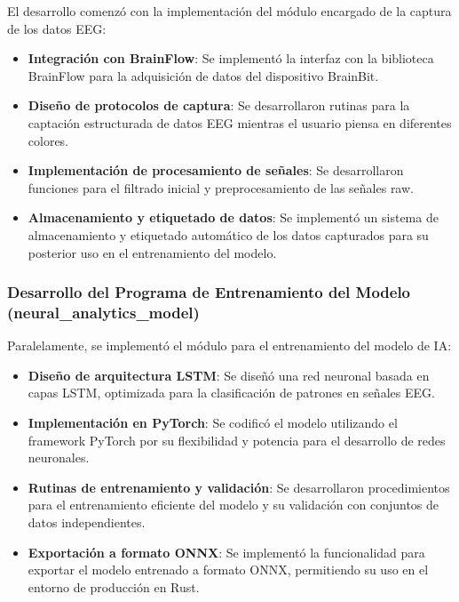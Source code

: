El desarrollo comenzó con la implementación del módulo encargado de la captura de los datos EEG:

\begin{itemize}
    \item \textbf{Integración con BrainFlow}: Se implementó la interfaz con la biblioteca BrainFlow para la adquisición de datos del dispositivo BrainBit.
    
    \item \textbf{Diseño de protocolos de captura}: Se desarrollaron rutinas para la captación estructurada de datos EEG mientras el usuario piensa en diferentes colores.
    
    \item \textbf{Implementación de procesamiento de señales}: Se desarrollaron funciones para el filtrado inicial y preprocesamiento de las señales raw.
    
    \item \textbf{Almacenamiento y etiquetado de datos}: Se implementó un sistema de almacenamiento y etiquetado automático de los datos capturados para su posterior uso en el entrenamiento del modelo.
\end{itemize}

\subsubsection{Desarrollo del Programa de Entrenamiento del Modelo (neural\_analytics\_model)}

Paralelamente, se implementó el módulo para el entrenamiento del modelo de IA:

\begin{itemize}
    \item \textbf{Diseño de arquitectura LSTM}: Se diseñó una red neuronal basada en capas LSTM, optimizada para la clasificación de patrones en señales EEG.
    
    \item \textbf{Implementación en PyTorch}: Se codificó el modelo utilizando el framework PyTorch por su flexibilidad y potencia para el desarrollo de redes neuronales.
    
    \item \textbf{Rutinas de entrenamiento y validación}: Se desarrollaron procedimientos para el entrenamiento eficiente del modelo y su validación con conjuntos de datos independientes.
    
    \item \textbf{Exportación a formato ONNX}: Se implementó la funcionalidad para exportar el modelo entrenado a formato ONNX, permitiendo su uso en el entorno de producción en Rust.
\end{itemize}

